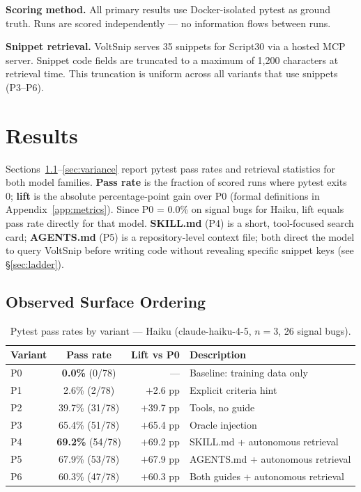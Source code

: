 \documentclass[10pt,a4paper,twocolumn]{article}
\begin{document}
\textbf{Scoring method.}
All primary results use Docker-isolated pytest as ground truth.
Runs are scored independently --- no information flows between runs.

\textbf{Snippet retrieval.}
VoltSnip serves 35 snippets for Script30 via a hosted MCP server.
Snippet code fields are truncated to a maximum of 1,200 characters at retrieval time.
This truncation is uniform across all variants that use snippets (P3--P6).

\section{Results}
\label{sec:results}

Sections~\ref{sec:surface-hierarchy}--\ref{sec:variance} report pytest pass rates and retrieval statistics for both model families.
\textbf{Pass rate} is the fraction of scored runs where pytest exits 0; \textbf{lift} is the absolute percentage-point gain over P0 (formal definitions in Appendix~\ref{app:metrics}).
Since P0 = 0.0\% on signal bugs for Haiku, lift equals pass rate directly for that model.
\textbf{SKILL.md} (P4) is a short, tool-focused search card; \textbf{AGENTS.md} (P5) is a repository-level context file; both direct the model to query VoltSnip before writing code without revealing specific snippet keys (see \S\ref{sec:ladder}).

\subsection{Observed Surface Ordering}
\label{sec:surface-hierarchy}

\begin{table}[t]
\centering
\caption{Pytest pass rates by variant --- Haiku (claude-haiku-4-5, $n{=}3$, 26 signal bugs).}
\label{tab:results-haiku}
\small
\begin{tabular}{@{}lcrl@{}}
\toprule
\textbf{Variant} & \textbf{Pass rate} & \textbf{Lift vs P0} & \textbf{Description} \\
\midrule
P0 & \textbf{0.0\%} (0/78)   & ---         & Baseline: training data only \\
P1 & 2.6\% (2/78)            & $+$2.6 pp   & Explicit criteria hint \\
P2 & 39.7\% (31/78)          & $+$39.7 pp  & Tools, no guide \\
P3 & 65.4\% (51/78)          & $+$65.4 pp  & Oracle injection \\
P4 & \textbf{69.2\%} (54/78) & $+$69.2 pp  & SKILL.md + autonomous retrieval \\
P5 & 67.9\% (53/78)          & $+$67.9 pp  & AGENTS.md + autonomous retrieval \\
P6 & 60.3\% (47/78)          & $+$60.3 pp  & Both guides + autonomous retrieval \\
\bottomrule
\end{tabular}
\end{table}
\end{document}
